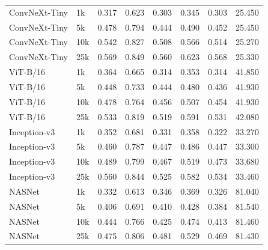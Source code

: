 \begin{center}
\begin{longtable}{llllllll}
        ConvNeXt-Tiny & 1k & 0.317 & 0.623 & 0.303 & 0.345 & 0.303 & 25.450 \\
        ConvNeXt-Tiny & 5k & 0.478 & 0.794 & 0.444 & 0.490 & 0.452 & 25.450 \\
        ConvNeXt-Tiny & 10k & 0.542 & 0.827 & 0.508 & 0.566 & 0.514 & 25.270 \\
        ConvNeXt-Tiny & 25k & 0.569 & 0.849 & 0.560 & 0.623 & 0.568 & 25.330 \\
        ViT-B/16 & 1k & 0.364 & 0.665 & 0.314 & 0.353 & 0.314 & 41.850 \\
        ViT-B/16 & 5k & 0.448 & 0.733 & 0.444 & 0.480 & 0.436 & 41.930 \\
        ViT-B/16 & 10k & 0.478 & 0.764 & 0.456 & 0.507 & 0.454 & 41.930 \\
        ViT-B/16 & 25k & 0.533 & 0.819 & 0.519 & 0.591 & 0.531 & 42.080 \\
        Inception-v3 & 1k & 0.352 & 0.681 & 0.331 & 0.358 & 0.322 & 33.270 \\
        Inception-v3 & 5k & 0.460 & 0.787 & 0.447 & 0.486 & 0.447 & 33.300 \\
        Inception-v3 & 10k & 0.489 & 0.799 & 0.467 & 0.519 & 0.473 & 33.680 \\
        Inception-v3 & 25k & 0.560 & 0.844 & 0.525 & 0.582 & 0.534 & 33.460 \\
        NASNet & 1k & 0.332 & 0.613 & 0.346 & 0.369 & 0.326 & 81.040 \\
        NASNet & 5k & 0.406 & 0.691 & 0.410 & 0.428 & 0.384 & 81.540 \\
        NASNet & 10k & 0.444 & 0.766 & 0.425 & 0.474 & 0.413 & 81.460 \\
        NASNet & 25k & 0.475 & 0.806 & 0.481 & 0.529 & 0.469 & 81.430 \\
        \bottomrule
        \end{longtable}
    \end{center}
    \cleardoublepage
    
